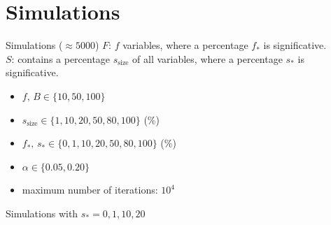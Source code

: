 \documentclass[aspectratio=169]{beamer}
\begin{document}


\section{Simulations}
\begin{frame}{Simulations ($\approx 5000$)}
$F$: $f$ variables, where a percentage $f_{*}$ is significative.\\
$S$: contains a percentage $s_{\text{size}}$ of all variables, where a percentage $s_{*}$ is significative.\\

\vspace{5mm}
\begin{itemize}
\item $f,\,B\in\{10,50,100\}$
\item $s_{\text{size}}\in\{1, 10, 20, 50, 80, 100\}$ (\%)
\item $f_{*},\,s_{*}\in\{0, 1, 10, 20, 50, 80, 100\}$ (\%)
\item $\alpha\in\{0.05,0.20\}$
\item maximum number of iterations: $10^4$
\end{itemize}
\end{frame}






\begin{frame}{Simulations with $s_{*}=0,1,10,20$}
\begin{table}[h!]
\centering
{}
\end{table}
\end{frame}
\end{document}
